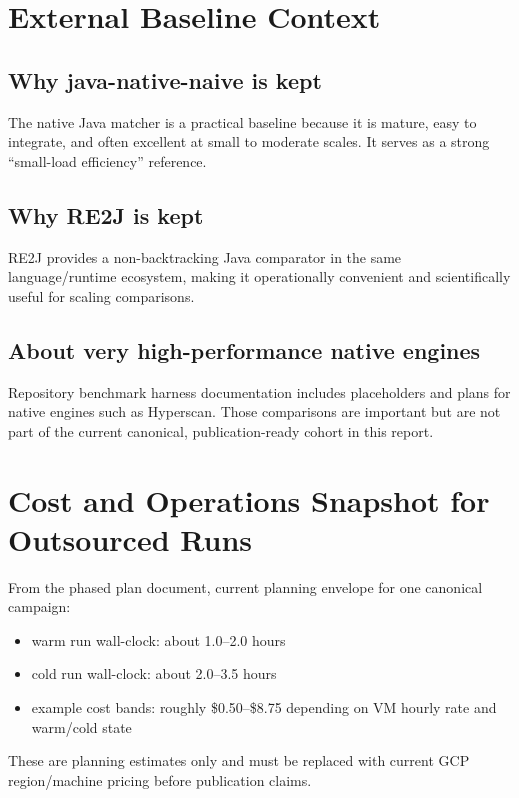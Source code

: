\documentclass[11pt]{article}
\begin{document}
\section{External Baseline Context}
\subsection{Why java-native-naive is kept}
The native Java matcher is a practical baseline because it is mature, easy to integrate, and often excellent at small to moderate scales. It serves as a strong ``small-load efficiency'' reference.

\subsection{Why RE2J is kept}
RE2J provides a non-backtracking Java comparator in the same language/runtime ecosystem, making it operationally convenient and scientifically useful for scaling comparisons.

\subsection{About very high-performance native engines}
Repository benchmark harness documentation includes placeholders and plans for native engines such as Hyperscan. Those comparisons are important but are not part of the current canonical, publication-ready cohort in this report.

\section{Cost and Operations Snapshot for Outsourced Runs}
From the phased plan document, current planning envelope for one canonical campaign:
\begin{itemize}
  \item warm run wall-clock: about 1.0--2.0 hours
  \item cold run wall-clock: about 2.0--3.5 hours
  \item example cost bands: roughly \$0.50--\$8.75 depending on VM hourly rate and warm/cold state
\end{itemize}
These are planning estimates only and must be replaced with current GCP region/machine pricing before publication claims.
\end{document}
